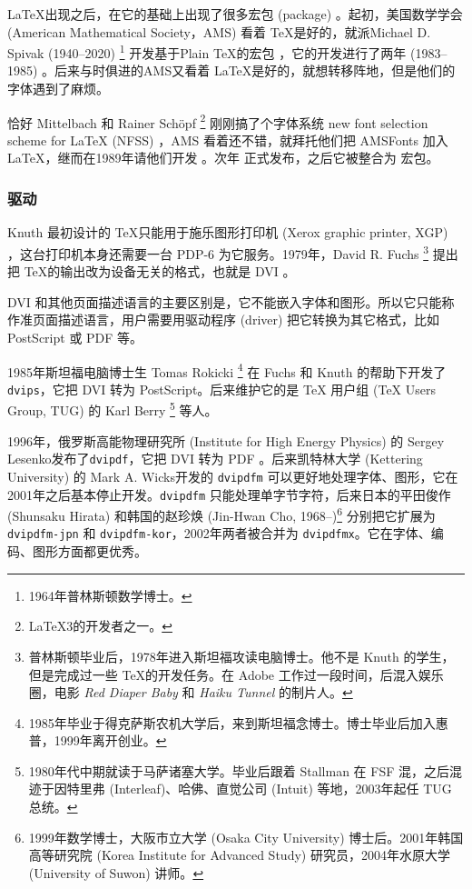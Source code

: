 \LaTeX 出现之后，在它的基础上出现了很多宏包 (package) 。起初，美国数学学会 (American Mathematical Society，AMS)\indexAMS{} 看着 \TeX 是好的，就派Michael D. Spivak (1940--2020)\indexSpivak{} \footnote{1964年普林斯顿数学博士。} 开发基于Plain \TeX 的宏包 \AmSTeX，它的开发进行了两年 (1983--1985) 。后来与时俱进的AMS又看着 \LaTeX 是好的，就想转移阵地，但是他们的字体遇到了麻烦。

恰好 Mittelbach 和 Rainer Schöpf\indexSchopf{} \footnote{\LaTeX 3的开发者之一。} 刚刚搞了个字体系统 new font selection scheme for \LaTeX{} (NFSS) ，AMS 看着还不错，就拜托他们把 AMSFonts 加入 \LaTeX，继而在1989年请他们开发 \AmSLaTeX。次年 \AmSLaTeX 正式发布，之后它被整合为 \AmS 宏包。

\subsubsection{驱动}

Knuth 最初设计的 \TeX 只能用于施乐图形打印机 (Xerox graphic printer, XGP) ，这台打印机本身还需要一台 PDP-6 为它服务。1979年，David R. Fuchs\indexFuchs{} \footnote{普林斯顿毕业后，1978年进入斯坦福攻读电脑博士。他不是 Knuth 的学生，但是完成过一些 \TeX 的开发任务。在 Adobe 工作过一段时间，后混入娱乐圈，电影 \emph{Red Diaper Baby} 和 \emph{Haiku Tunnel} 的制片人。} 提出把 \TeX 的输出改为设备无关的格式，也就是 DVI 。

DVI 和其他页面描述语言的主要区别是，它不能嵌入字体和图形。所以它只能称作准页面描述语言，用户需要用驱动程序 (driver) 把它转换为其它格式，比如 PostScript 或 PDF 等。

1985年斯坦福电脑博士生 Tomas Rokicki\indexRokicki{} \footnote{1985年毕业于得克萨斯农机大学后，来到斯坦福念博士。博士毕业后加入惠普，1999年离开创业。} 在 Fuchs 和 Knuth 的帮助下开发了\texttt{dvips}，它把 DVI 转为 PostScript。后来维护它的是 TeX 用户组 (TeX Users Group, TUG)\indexTUG{} 的 Karl Berry\indexBerry{} \footnote{1980年代中期就读于马萨诸塞大学。毕业后跟着 Stallman 在 FSF 混，之后混迹于因特里弗 (Interleaf)、哈佛、直觉公司 (Intuit) 等地，2003年起任 TUG 总统。} 等人。

1996年，俄罗斯高能物理研究所 (Institute for High Energy Physics) 的 Sergey Lesenko\indexLesenko 发布了\texttt{dvipdf}，它把 DVI 转为 PDF 。后来凯特林大学 (Kettering University) 的 Mark A. Wicks\indexWicks 开发的 \texttt{dvipdfm} 可以更好地处理字体、图形，它在2001年之后基本停止开发。\texttt{dvipdfm} 只能处理单字节字符，后来日本的平田俊作 (Shunsaku Hirata)\indexHirata{} 和韩国的赵珍焕 (Jin-Hwan Cho, 1968--)\indexCho{}\footnote{1999年数学博士，大阪市立大学 (Osaka City University) 博士后。2001年韩国高等研究院 (Korea Institute for Advanced Study) 研究员，2004年水原大学 (University of Suwon) 讲师。} 分别把它扩展为 \texttt{dvipdfm-jpn} 和 \texttt{dvipdfm-kor}，2002年两者被合并为 \texttt{dvipdfmx}。它在字体、编码、图形方面都更优秀。

